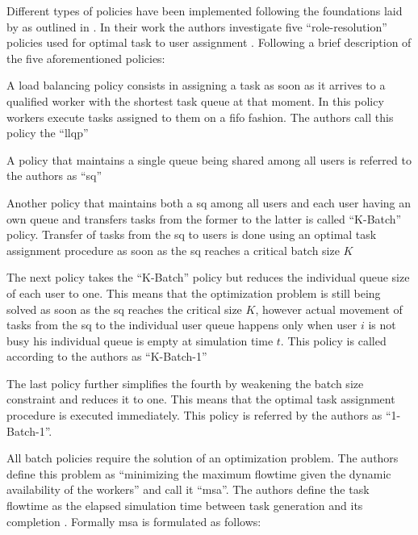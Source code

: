\documentclass[draft=false]{seal_thesis}
\begin{document}
Different types of policies have been implemented following the foundations laid by \citet{Zeng2005} as outlined in . In their work the authors investigate five ``role-resolution'' policies used for optimal task to user assignment \citep[p. 7]{Zeng2005}. Following a brief description of the five aforementioned policies:
\begin{enumerate*}
	\item A load balancing policy consists in assigning a task as soon as it arrives to a qualified worker with the shortest task queue at that moment. In this policy workers execute tasks assigned to them on a \gls{fifo} fashion. The authors call this policy the ``\gls{llqp}''
	\item A policy that maintains a single queue being shared among all users is referred to the authors as ``\gls{sq}''
	\item Another policy that maintains both a \gls{sq} among all users and each user having an own queue and transfers tasks from the former to the latter is called ``K-Batch'' policy. Transfer of tasks from the \gls{sq} to users is done using an optimal task assignment procedure as soon as the \gls{sq} reaches a critical batch size $K$
	\item The next policy takes the ``K-Batch'' policy but reduces the individual queue size of each user to one. This means that the optimization problem is still being solved as soon as the \gls{sq} reaches the critical size $K$, however actual movement of tasks from the \gls{sq} to the individual user queue happens only when user $i$ is not busy \ie his individual queue is empty at simulation time $t$. This policy is called according to the authors as ``K-Batch-1''
	\item The last policy further simplifies the fourth by weakening the batch size constraint and reduces it to one. This means that the optimal task assignment procedure is executed immediately. This policy is referred by the authors as ``1-Batch-1''.
\end{enumerate*}

All batch policies require the solution of an optimization problem. The authors define this problem as ``minimizing the maximum flowtime given the dynamic availability of the workers'' and call it ``\gls{msa}''\citep[p. 7]{Zeng2005}. The authors define the task flowtime as the elapsed simulation time between task generation and its completion \citep{Zeng2005,Baker1974}. Formally \gls{msa} is formulated as follows:
\end{document}
